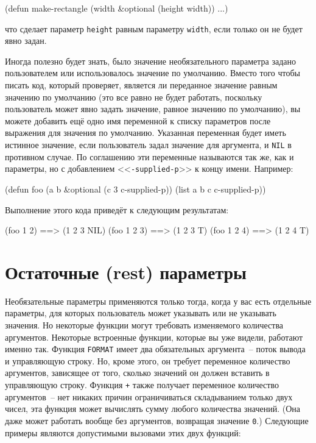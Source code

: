 \begin{myverb}
(defun make-rectangle (width &optional (height width)) 
  ...)
\end{myverb}

\noindent{}что сделает параметр \lstinline{height} равным параметру \lstinline{width}, если только он не будет
явно задан.

Иногда полезно будет знать, было значение необязательного параметра задано
пользователем или использовалось значение по умолчанию.  Вместо того чтобы писать код,
который проверяет, является ли переданное значение равным значению по умолчанию (это все
равно не будет работать, поскольку пользователь может явно задать значение, равное
значению по умолчанию), вы можете добавить ещё одно имя переменной к списку параметров
после выражения для значения по умолчанию.  Указанная переменная будет иметь истинное
значение, если пользователь задал значение для аргумента, и \lstinline{NIL} в противном случае.
По соглашению эти переменные называются так же, как и параметры, но с добавлением
<<\lstinline{-supplied-p}>> к концу имени. Например:

\begin{myverb}
(defun foo (a b &optional (c 3 c-supplied-p))
  (list a b c c-supplied-p))
\end{myverb}

Выполнение этого кода приведёт к следующим результатам:

\begin{myverb}
(foo 1 2)   ==> (1 2 3 NIL)
(foo 1 2 3) ==> (1 2 3 T)
(foo 1 2 4) ==> (1 2 4 T)
\end{myverb}

\section{Остаточные (rest) параметры}

Необязательные параметры применяются только тогда, когда у вас есть отдельные параметры,
для которых пользователь может указывать или не указывать значения.  Но некоторые функции
могут требовать изменяемого количества аргументов.  Некоторые встроенные функции, которые
вы уже видели, работают именно так.  Функция \lstinline{FORMAT} имеет два обязательных
аргумента~-- поток вывода и управляющую строку.  Но, кроме этого, он требует переменное
количество аргументов, зависящее от того, сколько значений он должен вставить в
управляющую строку.  Функция \lstinline{+} также получает переменное количество аргументов~--
нет никаких причин ограничиваться складыванием только двух чисел, эта функция может
вычислять сумму любого количества значений. (Она даже может работать вообще без
аргументов, возвращая значение \lstinline{0}.)  Следующие примеры являются допустимыми вызовами
этих двух функций:

